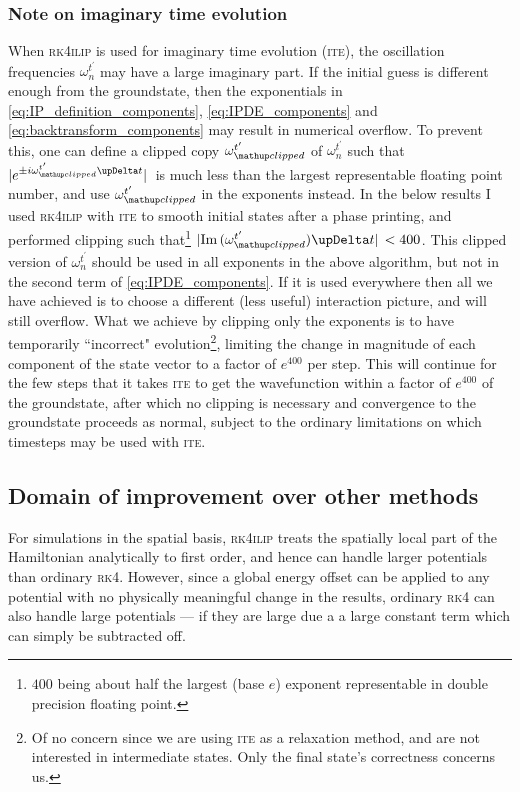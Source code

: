 \subsubsection{Note on imaginary time evolution}

When \textsc{rk4ilip} is used for imaginary time evolution (\textsc{ite}), the oscillation frequencies $\omega_n^{t^\prime}$ may have a large imaginary part. If the initial guess is different enough from the groundstate, then the exponentials in \eqref{eq:IP_definition_components}, \eqref{eq:IPDE_components} and \eqref{eq:backtransform_components} may result in numerical overflow. To prevent this, one can define a clipped copy $\omega^{t^\prime}_\up{clipped}$ of $\omega_n^{t^\prime}$ such that $\abs*{e^{\pm i\omega^{t^\prime}_\up{clipped}\upDelta t}}$ is much less than the largest representable floating point number, and use $\omega^{t^\prime}_\up{clipped}$ in the exponents instead. In the below results I used \textsc{rk4ilip} with \textsc{ite} to smooth initial states after a phase printing, and performed clipping such that\footnote{$400$ being about half the largest (base $e$) exponent representable in double precision floating point.} {$\abs*{\im{(\omega^{t^\prime}_\up{clipped})}\upDelta t} < 400$}. This clipped version of $\omega_n^{t^\prime}$ should be used in all exponents in the above algorithm, but not in the second term of \eqref{eq:IPDE_components}. If it is used everywhere then all we have achieved is to choose a different (less useful) interaction picture, and will still overflow. What we achieve by clipping only the exponents is to have temporarily ``incorrect" evolution\footnote{Of no concern since we are using \textsc{ite} as a relaxation method, and are not interested in intermediate states. Only the final state's correctness concerns us.}, limiting the change in magnitude of each component of the state vector to a factor of $e^{400}$ per step. This will continue for the few steps that it takes \textsc{ite} to get the wavefunction within a factor of $e^{400}$ of the groundstate, after which no clipping is necessary and convergence to the groundstate proceeds as normal, subject to the ordinary limitations on which timesteps may be used with \textsc{ite}.

\subsection{Domain of improvement over other methods}

 For simulations in the spatial basis, \textsc{rk4ilip} treats the spatially local part of the Hamiltonian analytically to first order, and hence can handle larger potentials than ordinary \textsc{rk4}. However, since a global energy offset can be applied to any potential with no physically meaningful change in the results, ordinary \textsc{rk4} can also handle large potentials --- if they are large due a a large constant term which can simply be subtracted off.

